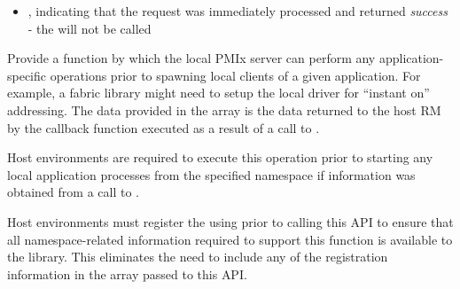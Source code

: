 \begin{arglist}
\end{arglist}

\returnsimplenb

\returnstart
\begin{itemize}
    \item {}, indicating that the request was immediately processed and returned \textit{success} - the  will not be called
\end{itemize}
\returnend

\descr

Provide a function by which the local \ac{PMIx} server can perform any application-specific operations prior to spawning local clients of a given application. For example, a fabric library might need to setup the local driver for ``instant on'' addressing. The data provided in the  array is the data returned to the host \ac{RM} by the callback function executed as a result of a call to .

\advicermstart
Host environments are required to execute this operation prior to starting any local application processes from the specified namespace if information was obtained from a call to .

Host environments must register the  using  prior to calling this \ac{API} to ensure that all namespace-related information required to support this function is available to the library. This eliminates the need to include any of the registration information in the  array passed to this \ac{API}.
\advicermend

\subsection{}

\summary

